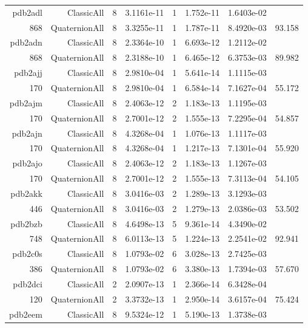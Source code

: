 \begin{xltabular}{\textwidth}{r|rcS[table-format=1.4e+2]cS[table-format=1.3e+2]S[table-format=1.4e+2]S[table-format=-1.3]}
pdb2adl & ClassicAll & 8 & 3.1161e-11 & 1 & 1.752e-11 & 1.6403e-02 & \\
868 & QuaternionAll & 8 & 3.3255e-11 & 1 & 1.787e-11 & 8.4920e-03 & 93.158\\  \addlinespace
pdb2adn & ClassicAll & 8 & 2.3364e-10 & 1 & 6.693e-12 & 1.2112e-02 & \\
868 & QuaternionAll & 8 & 2.3188e-10 & 1 & 6.465e-12 & 6.3753e-03 & 89.982\\  \addlinespace
pdb2ajj & ClassicAll & 8 & 2.9810e-04 & 1 & 5.641e-14 & 1.1115e-03 & \\
170 & QuaternionAll & 8 & 2.9810e-04 & 1 & 6.584e-14 & 7.1627e-04 & 55.172\\  \addlinespace
pdb2ajm & ClassicAll & 8 & 2.4063e-12 & 2 & 1.183e-13 & 1.1195e-03 & \\
170 & QuaternionAll & 8 & 2.7001e-12 & 2 & 1.555e-13 & 7.2295e-04 & 54.857\\  \addlinespace
pdb2ajn & ClassicAll & 8 & 4.3268e-04 & 1 & 1.076e-13 & 1.1117e-03 & \\
170 & QuaternionAll & 8 & 4.3268e-04 & 1 & 1.217e-13 & 7.1301e-04 & 55.920\\  \addlinespace
pdb2ajo & ClassicAll & 8 & 2.4063e-12 & 2 & 1.183e-13 & 1.1267e-03 & \\
170 & QuaternionAll & 8 & 2.7001e-12 & 2 & 1.555e-13 & 7.3113e-04 & 54.105\\  \addlinespace
pdb2akk & ClassicAll & 8 & 3.0416e-03 & 2 & 1.289e-13 & 3.1293e-03 & \\
446 & QuaternionAll & 8 & 3.0416e-03 & 2 & 1.279e-13 & 2.0386e-03 & 53.502\\  \addlinespace
pdb2bzb & ClassicAll & 8 & 4.6498e-13 & 5 & 9.361e-14 & 4.3490e-02 & \\
748 & QuaternionAll & 8 & 6.0113e-13 & 5 & 1.224e-13 & 2.2541e-02 & 92.941\\  \addlinespace
pdb2c0s & ClassicAll & 8 & 1.0793e-02 & 6 & 3.028e-13 & 2.7425e-03 & \\
386 & QuaternionAll & 8 & 1.0793e-02 & 6 & 3.380e-13 & 1.7394e-03 & 57.670\\  \addlinespace
pdb2dci & ClassicAll & 2 & 2.0907e-13 & 1 & 2.366e-14 & 6.3428e-04 & \\
120 & QuaternionAll & 2 & 3.3732e-13 & 1 & 2.950e-14 & 3.6157e-04 & 75.424\\  \addlinespace
pdb2eem & ClassicAll & 8 & 9.5324e-12 & 1 & 5.190e-13 & 1.3738e-03 & \\

\end{xltabular}
